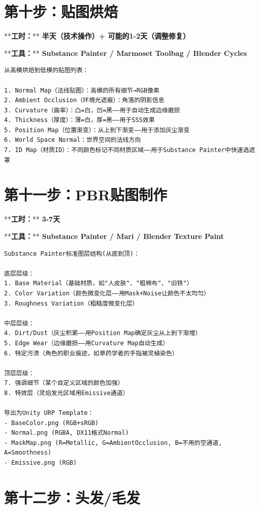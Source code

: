 \documentclass[12pt,a4paper,openany]{ctexbook}
\begin{document}
\section*{第十步：贴图烘焙}


**\textbf{工时：}**\textbf{ 半天（技术操作）+ 可能的1-2天（调整修复）}

**\textbf{工具：}**\textbf{ Substance Painter / Marmoset Toolbag / Blender Cycles}


\begin{verbatim}
从高模烘焙到低模的贴图列表：

1. Normal Map（法线贴图）：高模的所有细节→RGB像素
2. Ambient Occlusion（环境光遮蔽）：角落的阴影信息
3. Curvature（曲率）：凸=白，凹=黑——用于自动生成边缘磨损
4. Thickness（厚度）：薄=白，厚=黑——用于SSS效果
5. Position Map（位置渐变）：从上到下渐变——用于添加灰尘渐变
6. World Space Normal：世界空间的法线方向
7. ID Map（材质ID）：不同颜色标记不同材质区域——用于Substance Painter中快速选遮罩
\end{verbatim}


\section*{第十一步：PBR贴图制作}


**\textbf{工时：}**\textbf{ 3-7天}

**\textbf{工具：}**\textbf{ Substance Painter / Mari / Blender Texture Paint}


\begin{verbatim}
Substance Painter标准图层结构(从底到顶)：

底层层级：
1. Base Material（基础材质，如"人皮肤"、"粗棉布"、"旧铁"）
2. Color Variation（颜色微变化层——用Mask+Noise让颜色不太均匀）
3. Roughness Variation（粗糙度微变化层）

中层层级：
4. Dirt/Dust（灰尘积累——用Position Map确定灰尘从上到下渐增）
5. Edge Wear（边缘磨损——用Curvature Map自动生成）
6. 特定污渍（角色的职业痕迹，如草药学者的手指被灵植染色）

顶层层级：
7. 强调细节（某个自定义区域的颜色加强）
8. 特效层（灵焰发光区域用Emissive通道）

导出为Unity URP Template：
- BaseColor.png (RGB+sRGB)
- Normal.png (RGBA, DX11格式Normal)
- MaskMap.png (R=Metallic, G=AmbientOcclusion, B=不用的空通道, A=Smoothness)
- Emissive.png (RGB)
\end{verbatim}


\section*{第十二步：头发/毛发}
\end{document}
